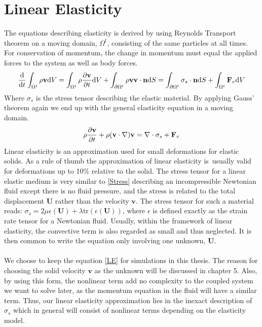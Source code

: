 \section{Linear Elasticity}
The equations describing elasticity is derived by using Reynolds Transport theorem on a moving domain, $\Omega^t$, consisting of the same particles at all times. For conservation of momentum, the change in momentum must equal the applied forces to the system as well as body forces.  
\begin{align}
\frac{\mathrm{d} }{\mathrm{d} t}\int_{\Omega^t} \rho \mathbf{v} \mathrm{d}V = \int_{\Omega^t} \rho \frac{\partial \mathbf{v}}{\partial t} \mathrm{d}V + \int_{\partial \Omega^t} \rho \mathbf{v} \mathbf{v}\cdot \mathbf{n} \mathrm{d}S = \int_{\partial \Omega^t} \sigma_s \cdot \mathbf{n} \mathrm{d}S + \int_{\Omega^t}\mathbf{F}_v \mathrm{d}V
\end{align}
Where $\sigma_s$ is the stress tensor describing the elastic material. By applying Gauss' theorem again we end up with the general elasticity equation in a moving domain.
\begin{align}
\rho \frac{\partial \mathbf{v}}{\partial t} + \rho( \mathbf{v} \cdot \nabla) \mathbf{v} = \nabla \cdot \sigma_s + \mathbf{F}_v \label{LE}
\end{align}
Linear elasticity is an approximation used for small deformations for elastic solids. As a rule of thumb the approximation of linear elasticity is usually valid for deformations up to 10\% relative to the solid. The stress tensor for a linear elastic medium is very similar to \eqref{Stress} describing an incompressible Newtonian fluid except there is no fluid pressure, and the stress is related to the total displacement $\mathbf{U}$ rather than the velocity $\mathbf{v}$. The stress tensor for such a material reads:
$\sigma_s = 2\mu\epsilon(\mathbf{U}) + \lambda \text{tr}(\epsilon(\mathbf{U}))$, where $\epsilon$ is defined exactly as the strain rate tensor for a Newtonian fluid. Usually, within the framework of linear elasticity, the convective term is also regarded as small and thus neglected. It is then common to write the equation only involving one unknown, $\mathbf{U}$.
\\
\\
We choose to keep the equation \eqref{LE} for simulations in this thesis. The reason for choosing the solid velocity $\mathbf{v}$ as the unknown will be discussed in chapter 5. Also, by using this form, the nonlinear term add no complexity to the coupled system we want to solve later, as the momentum equation in the fluid will have a similar term. Thus, our linear elasticity approximation lies in the inexact description of $\sigma_s$ which in general will consist of nonlinear terms depending on the elasticity model. \\ \\

